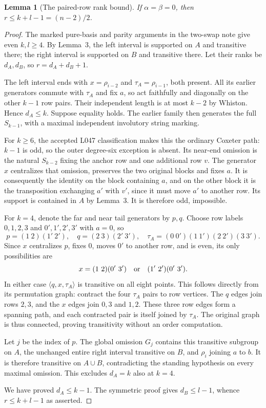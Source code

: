 \documentclass[11pt,a4paper]{article}
\newtheorem{lemma}{Lemma}
\newcommand{\gen}[1]{\langle#1\rangle}
\begin{document}
\begin{lemma}[The paired-row rank bound]
If $\alpha=\beta=0$, then
$r\leq k+l-1=(n-2)/2$.
\end{lemma}
\begin{proof}
The marked pure-basis and parity arguments in the two-swap note give
even $k,l\geq4$. By Lemma~3, the left interval is supported on $A$
and transitive there; the right interval is supported on $B$ and
transitive there. Let their ranks be $d_A,d_B$, so
$r=d_A+d_B+1$.

The left interval ends with $x=\rho_{i-2}$ and
$\tau_A=\rho_{i-1}$, both present. All its earlier generators
commute with $\tau_A$ and fix $a$, so act faithfully and diagonally
on the other $k-1$ row pairs. Their independent length is at most
$k-2$ by Whiston. Hence $d_A\leq k$. Suppose equality holds.
The earlier family then generates the full $S_{k-1}$, with a
maximal independent involutory string marking.

For $k\geq6$, the accepted L047 classification makes this the
ordinary Coxeter path: $k-1$ is odd, so the outer degree-six
exception is absent. Its near-end omission is the natural
$S_{k-2}$ fixing the anchor row and one additional row $v$.
The generator $x$ centralizes that omission, preserves the two
original blocks and fixes $a$. It is consequently the identity
on the block containing $a$, and on the other block it is the
transposition exchanging $a'$ with $v'$, since it must move
$a'$ to another row. Its support is contained in $A$ by Lemma~3.
It is therefore odd, impossible.

For $k=4$, denote the far and near tail generators by $p,q$.
Choose row labels $0,1,2,3$ and $0',1',2',3'$ with $a=0$, so
\[
 p=(1\ 2)(1'\ 2'),\quad q=(2\ 3)(2'\ 3'),\quad
 \tau_A=(0\ 0')(1\ 1')(2\ 2')(3\ 3').
\]
Since $x$ centralizes $p$, fixes $0$, moves $0'$ to another row,
and is even, its only possibilities are
\[
               x=(1\ 2)(0'\ 3')
                 \quad\hbox{or}\quad(1'\ 2')(0'\ 3').
\]
In either case $\gen{q,x,\tau_A}$ is transitive on all eight
points. This follows directly from its permutation graph:
contract the four $\tau_A$ pairs to row vertices. The $q$ edges
join rows $2,3$, and the $x$ edges join $0,3$ and $1,2$.
These three row edges form a spanning path, and each contracted
pair is itself joined by $\tau_A$. The original graph is thus
connected, proving transitivity without an order computation.

Let $j$ be the index of $p$. The global omission $G_j$ contains
this transitive subgroup on $A$, the unchanged entire right
interval transitive on $B$, and $\rho_i$ joining $a$ to $b$.
It is therefore transitive on $A\cup B$, contradicting the
standing hypothesis on every maximal omission. This excludes
$d_A=k$ also at $k=4$.

We have proved $d_A\leq k-1$. The symmetric proof gives
$d_B\leq l-1$, whence $r\leq k+l-1$ as asserted.
\end{proof}
\end{document}
